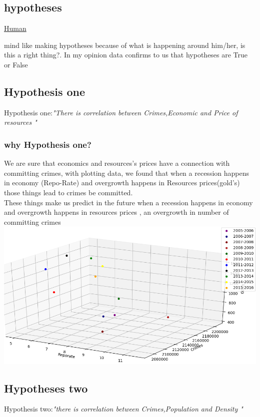 \documentclass[landscape,17pt]{extarticle}
\begin{document}
    \subsection{hypotheses}
     \hypertarget{hypotheses}{\hyperlink{[1]}{Human}} mind like making hypotheses because of what is happening around him/her, is this a right thing?. In my opinion data confirms to us that hypotheses are True or False

    \subsection{Hypothesis one}
             Hypothesis one:\textit{"There is correlation between Crimes,Economic and Price of resources "}
             \subsubsection{why Hypothesis one?}
             We are sure that economics and resources’s prices have a connection with committing crimes, with plotting data, we found that when a recession happens in economy (Repo-Rate) and overgrowth happens in Resources prices(gold’s) those things lead to crimes be committed.\\These things make us predict in the future when a recession happens in economy and overgrowth happens in resources prices , an overgrowth in number of committing crimes\\
        \includegraphics[width=.7\textwidth]{Images/Figure6.png}
\newpage
    \subsection{Hypotheses two}
         Hypothesis two:\textit{"there is correlation between Crimes,Population and Density "}\\
\end{document}
